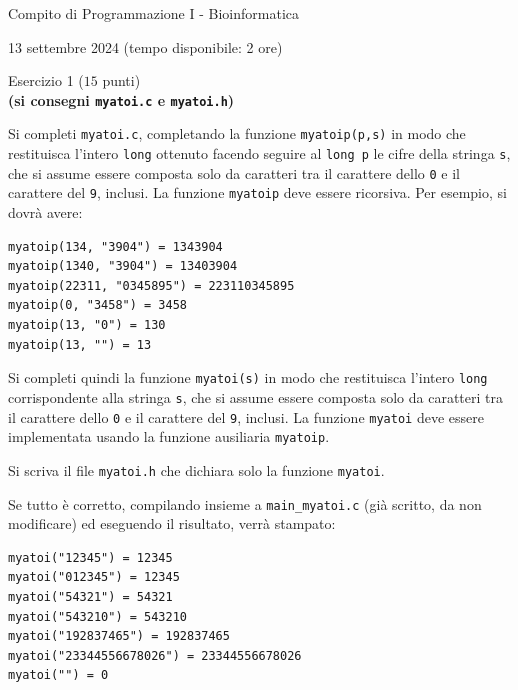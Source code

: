 \documentclass[12pt]{article}
\begin{document}
\begin{center}{\LARGE Compito di Programmazione I - Bioinformatica}\\
\begin{center}
  \large 13 settembre 2024 (tempo disponibile: 2 ore)
\end{center}
\end{center}

\vspace*{1ex}
\begin{center}{\Large Esercizio 1} ($15$ punti)\\
  \textbf{(si consegni \texttt{myatoi.c} e \texttt{myatoi.h})}
\end{center}

Si completi \texttt{myatoi.c}, completando la funzione
\texttt{myatoip(p,s)} in modo che restituisca
l'intero \texttt{long} ottenuto facendo seguire al
\texttt{long p} le cifre della stringa \texttt{s}, che si assume essere composta
solo da caratteri
tra il carattere dello \texttt{0} e il carattere del \texttt{9}, inclusi.
La funzione \texttt{myatoip}
deve essere ricorsiva. Per esempio, si dovr\`a avere:

\begin{mdframed}[backgroundcolor=verylightgray] 
\begin{verbatim}
myatoip(134, "3904") = 1343904
myatoip(1340, "3904") = 13403904
myatoip(22311, "0345895") = 223110345895
myatoip(0, "3458") = 3458
myatoip(13, "0") = 130
myatoip(13, "") = 13
\end{verbatim}
\end{mdframed}

Si completi quindi la funzione \texttt{myatoi(s)} in modo che restituisca
l'intero \texttt{long} corrispondente alla stringa \texttt{s}, che si assume essere
composta solo da caratteri tra il carattere dello \texttt{0} e il carattere del \texttt{9},
inclusi. La funzione \texttt{myatoi} deve essere implementata usando la funzione ausiliaria
\texttt{myatoip}.

Si scriva il file \texttt{myatoi.h} che dichiara solo la funzione \texttt{myatoi}.

Se tutto \`e corretto, compilando insieme a \texttt{main\_myatoi.c} (gi\`a scritto, da non
modificare) ed ese\-guendo il risultato, verr\`a stampato:

\begin{mdframed}[backgroundcolor=verylightgray] 
\begin{verbatim}
myatoi("12345") = 12345
myatoi("012345") = 12345
myatoi("54321") = 54321
myatoi("543210") = 543210
myatoi("192837465") = 192837465
myatoi("23344556678026") = 23344556678026
myatoi("") = 0
\end{verbatim}
\end{mdframed}
\end{document}
